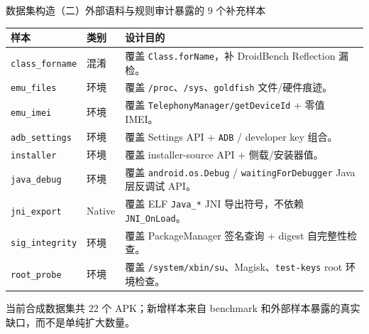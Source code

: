 \documentclass[10pt,aspectratio=169]{beamer}
\begin{document}
\begin{frame}{数据集构造（二）}{外部语料与规则审计暴露的 9 个补充样本}
  \scriptsize
  \begin{table}
    \centering
    \begin{tabular}{p{3.0cm}p{1.7cm}p{5.9cm}}
      \toprule
      样本 & 类别 & 设计目的 \\
      \midrule
      \texttt{class\_forname} & 混淆 & 覆盖 \texttt{Class.forName}，补 DroidBench Reflection 漏检。 \\
      \texttt{emu\_files} & 环境 & 覆盖 \texttt{/proc}、\texttt{/sys}、\texttt{goldfish} 文件/硬件痕迹。 \\
      \texttt{emu\_imei} & 环境 & 覆盖 \texttt{TelephonyManager/getDeviceId} + 零值 IMEI。 \\
      \texttt{adb\_settings} & 环境 & 覆盖 Settings API + \texttt{ADB} / developer key 组合。 \\
      \texttt{installer} & 环境 & 覆盖 installer-source API + 侧载/安装器值。 \\
      \texttt{java\_debug} & 环境 & 覆盖 \texttt{android.os.Debug} / \texttt{waitingForDebugger} Java 层反调试 API。 \\
      \texttt{jni\_export} & Native & 覆盖 ELF \texttt{Java\_*} JNI 导出符号，不依赖 \texttt{JNI\_OnLoad}。 \\
      \texttt{sig\_integrity} & 环境 & 覆盖 PackageManager 签名查询 + digest 自完整性检查。 \\
      \texttt{root\_probe} & 环境 & 覆盖 \texttt{/system/xbin/su}、Magisk、\texttt{test-keys} root 环境检查。 \\
      \bottomrule
    \end{tabular}
  \end{table}
  \vspace{0.35em}
  当前合成数据集共 22 个 APK；新增样本来自 benchmark 和外部样本暴露的真实缺口，而不是单纯扩大数量。
\end{frame}
\end{document}
